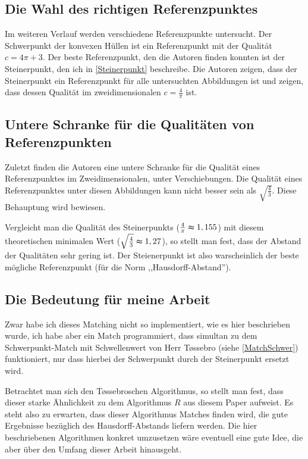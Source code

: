 \subsection{Die Wahl des richtigen Referenzpunktes}

Im weiteren Verlauf werden verschiedene Referenzpunkte untersucht. Der Schwerpunkt der konvexen Hüllen ist ein Referenzpunkt mit der Qualität $c=4\pi+3$. Der beste Referenzpunkt, den die Autoren finden konnten ist der Steinerpunkt, den ich in \ref{Steinerpunkt} beschreibe. Die Autoren zeigen, dass der Steinerpunkt ein Referenzpunkt für alle untersuchten Abbildungen ist und zeigen, dass dessen Qualität im zweidimensionalen $c=\frac{4}{\pi}$ ist. 

\subsection{Untere Schranke für die Qualitäten von Referenzpunkten}

Zuletzt finden die Autoren eine untere Schranke für die Qualität eines Referenzpunktes im Zweidimensionalen, unter Verschiebungen. Die Qualität eines Referenzpunktes unter diesen Abbildungen kann nicht besser sein als $\sqrt{\frac{4}{3}}$. Diese Behauptung wird bewiesen. 

Vergleicht man die Qualität des Steinerpunkts ($\frac{4}{\pi}\thickapprox 1,155$) mit diesem theoretischen minimalen Wert ($\sqrt{\frac{4}{3}}\thickapprox 1,27$), so stellt man fest, dass der Abstand der Qualitäten sehr gering ist. Der Steienerpunkt ist also warscheinlich der beste mögliche Referenzpunkt (für die Norm ,,Hausdorff-Abstand'').

\subsection{Die Bedeutung für meine Arbeit}\label{BedeutungAAR}

Zwar habe ich dieses Matching nicht so implementiert, wie es hier beschrieben wurde, ich habe aber ein Match programmiert, dass simultan zu dem Schwerpunkt-Match mit Schwellenwert von Herr T\o{}ssebro (siehe \ref{MatchSchwer}) funktioniert, nur dass hierbei der Schwerpunkt durch der Steinerpunkt ersetzt wird.

Betrachtet man sich den T\o{}ssebroschen Algorithmus, so stellt man fest, dass dieser starke Ähnlichkeit zu dem Algorithmus $R$ aus diesem Paper aufweist. Es steht also zu erwarten, dass dieser Algorithmus Matches finden wird, die gute Ergebnisse bezüglich des Hausdorff-Abstands liefern werden. Die hier beschriebenen Algorithmen konkret umzusetzen wäre eventuell eine gute Idee, die aber über den Umfang dieser Arbeit hinausgeht.

